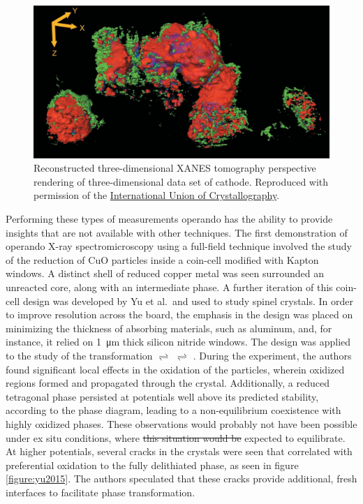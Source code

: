 \documentclass[journal=cmatex,manuscript=perspective]{achemso}
\newcommand{\iucr}{Reproduced with permission of the
  \href{http://journals.iucr.org/}{International Union of
    Crystallography}.}
\providecommand{\DIFaddtex}[1]{{\protect\color{blue}\uwave{#1}}} %
\providecommand{\DIFdeltex}[1]{{\protect\color{red}\sout{#1}}}                      %
\providecommand{\DIFaddbegin}{} %
\providecommand{\DIFaddend}{} %
\providecommand{\DIFdelbegin}{} %
\providecommand{\DIFdelend}{} %
\providecommand{\DIFadd}[1]{\texorpdfstring{\DIFaddtex{#1}}{#1}} %
\providecommand{\DIFdel}[1]{\texorpdfstring{\DIFdeltex{#1}}{}} %
\begin{document}
\begin{figure}
  \includegraphics[width=\textwidth]{meirer2011.png}
  \caption{Reconstructed three-dimensional XANES tomography
    perspective rendering of three-dimensional data set of 
    cathode.\cite{meirer2011} \iucr}
  \label{figure:meirer2011}
\end{figure}

Performing these types of measurements operando has the ability to
provide insights that are not available with other techniques. The
first demonstration of operando X-ray spectromicroscopy using a
full-field technique involved the study of the reduction of CuO
particles inside a coin-cell modified with Kapton
windows\cite{wang2013}. A distinct shell of reduced copper metal was
seen surrounded \DIFaddbegin \DIFadd{by }\DIFaddend an unreacted  core, along with an
intermediate  phase. A further iteration of this coin-cell
design was developed by Yu et al.\ and used to study 
spinel crystals. In order to improve resolution across the board, the
emphasis in the design was placed on minimizing the thickness of
absorbing materials, such as aluminum, and, for instance, it relied on
\SI{1}{\micro\meter} thick silicon nitride windows. The design was
applied to the study of the transformation 
$\rightleftharpoons$  $\rightleftharpoons$
\cite{ohzuku1990}. During the experiment, the authors found
significant local effects in the oxidation of the particles, wherein
oxidized  regions formed and propagated through the
crystal. Additionally, a reduced tetragonal  phase
persisted at potentials well above its predicted stability, according
to the phase diagram, leading to a non-equilibrium coexistence with
highly oxidized phases. These observations would probably not have
been possible under ex situ conditions, where \DIFdelbegin \DIFdel{this situation would be
}\DIFdelend \DIFaddbegin \DIFadd{the chemical states are
}\DIFaddend expected to equilibrate. At higher potentials, several cracks in the
crystals were seen that correlated with preferential oxidation to the
fully delithiated  phase, as seen in figure
\ref{figure:yu2015}. The authors speculated that these cracks provide
additional, fresh interfaces to facilitate phase
transformation\cite{yu2015}.
\end{document}
